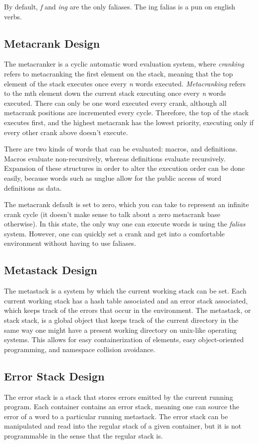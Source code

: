 \documentclass[
	a4paper,
	10pt,
	twoside,
]{LTJournalArticle}
\begin{document}
By default, \emph{f} and \emph{ing} are the only faliases. The ing falias is a pun on english verbs.
\subsection{Metacrank Design}
The metacranker is a cyclic automatic word evaluation system, where \emph{cranking} refers to metacranking the first
element on the stack, meaning that the top element of the stack executes once every \emph{n} words executed. \emph{Metacranking}
refers to the mth element down the current stack executing once every \emph{n} words executed. There can only be one word
executed every crank, although all metacrank positions are incremented every cycle. Therefore, the top of the stack executes
first, and the highest metacrank has the lowest priority, executing only if every other crank above doesn't execute.

There are two kinds of words that can be evaluated: macros, and definitions. Macros evaluate non-recursively, whereas definitions
evaluate recursively. Expansion of these structures in order to alter the execution order can be done easily, because words
such as unglue allow for the public access of word definitions as data.

The metacrank default is set to zero, which you can take to represent an infinite crank cycle (it doesn't make sense to talk
about a zero metacrank base otherwise). In this state, the only way one can execute words is using the \emph{falias} system.
However, one can quickly set a crank and get into a comfortable environment without having to use faliases.
\subsection{Metastack Design}
The metastack is a system by which the current working stack can be set. Each current working stack has a hash table associated
and an error stack associated, which keeps track of the errors that occur in the environment. The metastack, or stack stack,
is a global object that keeps track of the current directory in the same way one might have a present working directory on
unix-like operating systems. This allows for easy containerization of elements, easy object-oriented programming, and
namespace collision avoidance.
\subsection{Error Stack Design}
The error stack is a stack that stores errors emitted by the current running program. Each container contains an error stack,
meaning one can source the error of a word to a particular running metastack. The error stack can be manipulated and read
into the regular stack of a given container, but it is not programmable in the sense that the regular stack is.
\end{document}
